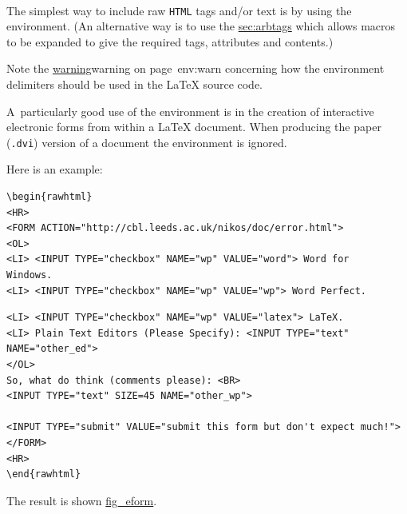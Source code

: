 %
\paragraph*{\label{rawhtml}}
The simplest way to include raw \texttt{HTML} tags and/or text 
is by using the  environment.
(An alternative way is to use the  
\hyperref{command,}{command, described in Section~}{,}{sec:arbtags}
which allows macros to be expanded to give the required tags, attributes
and contents.)

\noindent
Note the \hyperref[page]{warning}{warning on page~}{}{env:warn}
concerning how the environment delimiters should be used in the
\LaTeX{} source code.

\medskip
{}\label{eform}\html{\\}\noindent
A~particularly good use of the  environment
is in the creation of interactive
electronic forms
from within a \LaTeX{}  document. 
When producing the paper (\texttt{.dvi}) version
of a document the  environment is ignored.

\medskip
{}\html{\\}%
\noindent
Here is an example: 
\begin{small}
\begin{verbatim}
\begin{rawhtml}
<HR>
<FORM ACTION="http://cbl.leeds.ac.uk/nikos/doc/error.html">
<OL>
<LI> <INPUT TYPE="checkbox" NAME="wp" VALUE="word"> Word for
Windows.
<LI> <INPUT TYPE="checkbox" NAME="wp" VALUE="wp"> Word Perfect.
\end{verbatim}
\begin{verbatim}
<LI> <INPUT TYPE="checkbox" NAME="wp" VALUE="latex"> LaTeX.
<LI> Plain Text Editors (Please Specify): <INPUT TYPE="text" NAME="other_ed">
</OL>
So, what do think (comments please): <BR>
<INPUT TYPE="text" SIZE=45 NAME="other_wp">

<INPUT TYPE="submit" VALUE="submit this form but don't expect much!">
</FORM>
<HR>
\end{rawhtml}
\end{verbatim}
\end{small}
%
\noindent
The result is shown \hyperref{below}{in Figure~}{}{fig_eform}.

